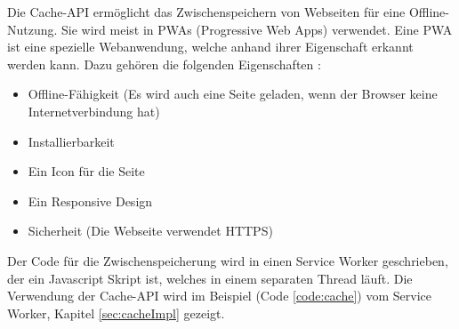 
Die Cache-API ermöglicht das Zwischenspeichern von Webseiten für eine Offline-Nutzung.
Sie wird meist in PWAs (Progressive Web Apps) verwendet. Eine PWA ist eine spezielle Webanwendung, welche anhand ihrer Eigenschaft erkannt werden kann. Dazu gehören die folgenden Eigenschaften \cite{datacodedesignPWA}:
\begin{itemize}
    \item Offline-Fähigkeit (Es wird auch eine Seite geladen, wenn der Browser keine Internetverbindung hat)
    \item Installierbarkeit 
    \item Ein Icon für die Seite
    \item Ein Responsive Design
    \item Sicherheit (Die Webseite verwendet HTTPS)
\end{itemize}

Der Code für die Zwischenspeicherung wird in einen Service Worker geschrieben, der ein Javascript Skript ist, welches in einem separaten Thread läuft. 
Die Verwendung der Cache-API wird im Beispiel (Code \ref{code:cache}) vom Service Worker, Kapitel \ref{sec:cacheImpl} gezeigt.